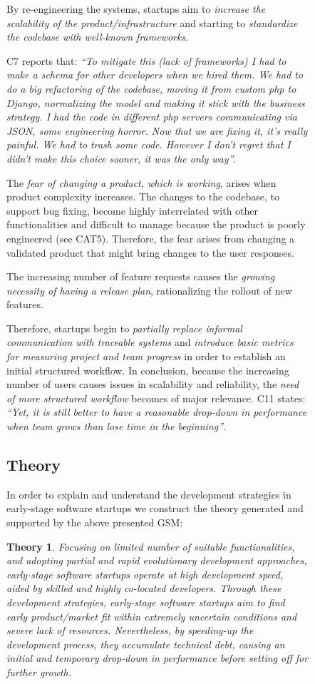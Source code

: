 \documentclass[12pt,journal,compsoc]{../sty/IEEEtran}
\newtheorem*{theory}{Theory}
\begin{document}
\begin{table}[!t]
\begin{figure}[!t]
\begin{compactitem}
By re-engineering the systems, startups aim to \textit{increase the scalability
of the product/infrastructure} and starting to \textit{standardize the codebase
with well-known frameworks}.

C7 reports that: \textit{``To mitigate this (lack of frameworks) I had to make
a schema for other developers when we hired them. We had to do a big
refactoring of the codebase, moving it from custom php to Django, normalizing
the model and making it stick with the business strategy. I had the code in
different php servers communicating via JSON, some engineering horror. Now  that
we are fixing it, it's really painful. We had to trash some code. However I
don't regret that I didn't make this choice sooner, it was the only way''}.

The \textit{fear of changing a product, which is working}, arises when product
complexity increases. The changes to the codebase, to support bug fixing, become
highly interrelated with other functionalities and difficult to manage because
the product is poorly engineered (see CAT5). Therefore, the fear arises from
changing a validated product that might bring changes to the user responses.

The increasing number of feature requests causes the \textit{growing necessity
of having a release plan}, rationalizing the rollout of new features.

Therefore, startups begin to \textit{partially replace informal communication
with traceable systems} and \textit{introduce basic metrics for measuring
project and team progress} in order to establish an initial structured workflow.
In conclusion, because the increasing number of users causes issues in
scalability and reliability, the \textit{need of more structured workflow}
becomes of major relevance. C11 states: \textit{``Yet, it is still better to
have a reasonable drop-down in performance when team grows than lose time in the
beginning''}.
\subsection{Theory} \label{res:gsm:th} In order to explain and understand the
development strategies in early-stage  software startups we construct the theory
generated and supported by the above  presented GSM:

\begin{theory} Focusing on limited number of suitable functionalities, and
adopting partial  and rapid evolutionary development approaches, early-stage
software startups  operate at high development speed, aided by skilled and
highly co-located  developers. Through these development strategies, early-stage
software startups  aim to find early product/market fit within extremely
uncertain conditions and  severe lack of resources. Nevertheless, by speeding-up
the development process,  they accumulate technical debt, causing an initial and
temporary drop-down in  performance before setting off for further growth.
\end{theory}


\end{compactitem}
\end{figure}
\end{table}
\end{document}
